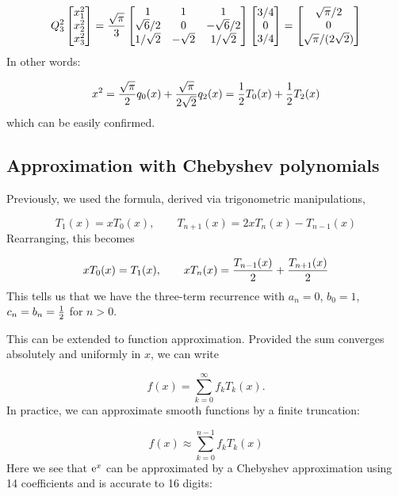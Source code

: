 \documentclass[12pt,a4paper]{article}
\begin{document}
\[
Q_3^2 \begin{bmatrix}
x_1^2 \\
x_2^2 \\
x_3^2 
\end{bmatrix} = {\sqrt{\ensuremath{\pi}} \over 3} 
\begin{bmatrix} 1 & 1 & 1 \\
\sqrt{6}/2 & 0 & -\sqrt{6}/2 \\
1/\sqrt{2} &-\sqrt{2} & 1/\sqrt{2}
\end{bmatrix} 
\begin{bmatrix} 3/4 \\ 0 \\ 3/4 \end{bmatrix} =
\begin{bmatrix}
{\sqrt{\ensuremath{\pi}} / 2} \\
0 \\
{\sqrt{\ensuremath{\pi}} / (2\sqrt{2})}
\end{bmatrix}
\]
In other words:

\[
x^2 = {\sqrt \ensuremath{\pi} \over 2} q_0(x) + {\sqrt \ensuremath{\pi} \over 2\sqrt 2} q_2(x) = {1 \over 2} T_0(x) + {1 \over 2} T_2(x)
\]
which can be easily confirmed.

\subsection{Approximation with Chebyshev polynomials}
Previously, we used the formula, derived via trigonometric manipulations,

\[
T_1(x) = x T_0(x), \qquad
T_{n+1}(x) = 2x T_n(x) - T_{n-1}(x)
\]
Rearranging, this becomes

\[
 x T_0(x) = T_1(x), \qquad
x T_n(x)  =  {T_{n-1}(x) \over 2} + {T_{n+1}(x) \over 2}
\]
This tells us that we have the three-term recurrence with $a_n = 0$, $b_0 = 1$, $c_n = b_n = {1 \over 2}$ for $n > 0$.

This can be extended to function approximation. Provided the sum converges absolutely and uniformly in $x$, we can write

\[
f(x) = \sum_{k=0}^\infty f_k T_k(x).
\]
In practice, we can approximate smooth functions by a finite truncation:

\[
f(x) \approx \sum_{k=0}^{n-1} f_k T_k(x)
\]
Here we see that ${\rm e}^x$ can be approximated by a Chebyshev approximation using 14 coefficients and is accurate to 16 digits:
\end{document}
